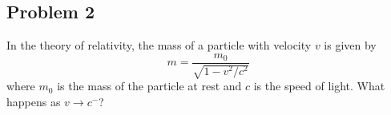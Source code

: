 \documentclass[10pt]{book}
\theoremstyle{definition}
\begin{document}
\subsection*{Problem 2} In the theory of relativity, the mass of a particle with velocity $v$ is given by
\[
m=\frac{m_0}{\sqrt{1-v^2/c^2}}
\]
where $m_0$ is the mass of the particle at rest and $c$ is the speed of light. What happens as $v\rightarrow c^-$?
\end{document}

